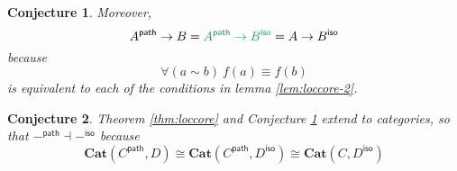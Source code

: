 \documentclass{article}
\newtheorem{conjecture}{Conjecture}
\newcommand{\ms}[1]{\ensuremath{\mathsf{#1}}}
\newcommand{\mb}[1]{\ensuremath{\mathbf{#1}}}
\newcommand{\iso}{\ms{iso}}
\renewcommand{\path}{\ms{path}}
\newcommand{\pathto}{\sim}
\begin{document}
\begin{conjecture} \label{cnj:loccore} Moreover,
  \[ A^\path \to B = {\color{ForestGreen} A^\path \to B^\iso} = A \to B^\iso \]
  because
  \[ \forall(a \pathto b)\ f(a) \equiv f(b) \]
  is equivalent to each of the conditions in lemma \ref{lem:loccore-2}.
\end{conjecture}


\begin{conjecture}
  Theorem \ref{thm:loccore} and Conjecture \ref{cnj:loccore} extend to
  categories, so that $-^\path \dashv -^\iso$ because
  \begin{equation}
    \mb{Cat}(C^\path, D) \cong \mb{Cat}(C^\path, D^\iso) \cong \mb{Cat}(C, D^\iso)
  \end{equation}
\end{conjecture}
\end{document}
